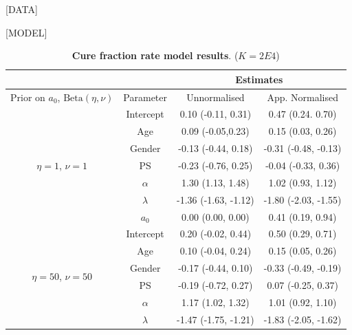 \documentclass[a4paper, notitlepage, 11pt]{article}
\begin{document}
[DATA]

[MODEL]

\begin{table}[!ht]
\caption{\textbf{Cure fraction rate model results}. ($K = 2E4$)}
\begin{tabular}{cccc}
\hline
                                            &           & \multicolumn{2}{c}{Estimates}                      \\ \hline
Prior on $a_0$, $\text{Beta}(\eta, \nu)$    & Parameter & Unnormalised         & App. Normalised  \\
\hline
\multirow{7}{*}{$\eta = 1$, $\nu  = 1$}     & Intercept & 0.10 (-0.11, 0.31)   & 0.47 (0.24. 0.70)           \\
                                            & Age       & 0.09 (-0.05,0.23)    & 0.15 (0.03, 0.26)           \\
                                            & Gender    & -0.13 (-0.44, 0.18)  & -0.31 (-0.48, -0.13)        \\
                                            & PS        & -0.23 (-0.76, 0.25)  & -0.04 (-0.33, 0.36)         \\
                                            & $\alpha$  & 1.30 (1.13, 1.48)    & 1.02 (0.93, 1.12)           \\
                                            & $\lambda$ & -1.36 (-1.63, -1.12) & -1.80 (-2.03, -1.55)        \\
                                            & $a_0$     & 0.00 (0.00, 0.00)    & 0.41 (0.19, 0.94)           \\
\multirow{7}{*}{$\eta = 50$, $\nu  = 50$}   & Intercept & 0.20 (-0.02, 0.44)   & 0.50 (0.29, 0.71)           \\
                                            & Age       & 0.10 (-0.04, 0.24)   & 0.15 (0.05, 0.26)           \\
                                            & Gender    & -0.17 (-0.44, 0.10)  & -0.33 (-0.49, -0.19)         \\
                                            & PS        & -0.19 (-0.72, 0.27)  & 0.07 (-0.25, 0.37)          \\
                                            & $\alpha$  & 1.17 (1.02, 1.32)    & 1.01 (0.92, 1.10)           \\
                                            & $\lambda$ & -1.47 (-1.75, -1.21) & -1.83 (-2.05, -1.62)        \\

\end{tabular}
\end{table}
\end{document}
